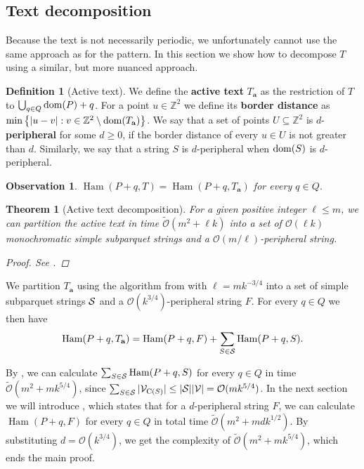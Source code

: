 \documentclass[11pt]{article}
\newcommand{\Z}{\mathbb{Z}}
\renewcommand{\O}{\mathcal{O}}
\newcommand{\tO}{\tilde{\mathcal{O}}}
\newcommand{\set}[1]{\left\lbrace #1 \right\rbrace}
\theoremstyle{plain}
\newtheorem{theorem}{Theorem}
\newtheorem{observation}{Observation}
\theoremstyle{definition}
\newtheorem{definition}{Definition}
\theoremstyle{remark}
\DeclareMathOperator*{\Ham}{Ham}
\begin{document}
\subsection{Text decomposition}
Because the text is not necessarily periodic, we unfortunately cannot use the same approach as for the pattern.
In this section we show how to decompose $T$ using a similar, but more nuanced approach.


\newcommand{\Ta}{T_\mathbf{a}}
\begin{definition}[Active text]
	We define the \textbf{active text} $\Ta$ as the restriction of $T$ to $\bigcup_{q \in Q} \d{P} + q$.
	For a point $u \in \Z^2$ we define its \textbf{border distance} as
	$\min\set{|u - v| : v \in \Z^2 \setminus \d{\Ta}} $.
	We say that a set of points $U \subseteq \Z^2$ is $d$-\textbf{peripheral} for some $d \ge 0$, if the border distance of every $u \in U$ is not greater than $d$.
	Similarly, we say that a string $S$ is $d$-peripheral when $\d{S}$ is $d$-peripheral.
\end{definition}


\begin{observation}
	$\Ham(P + q, T) = \Ham(P + q, \Ta)$ for every $q \in Q$.
\end{observation}


\begin{theorem}[Active text decomposition]\label{text_decomposition}
	For a given positive integer $\ell \le m$, we can partition the active text in time $\tO(m^2 + \ell k)$ into a set of $\O(\ell k)$ monochromatic simple subparquet strings
	and a $\O(m / \ell)$-peripheral string.
	\begin{proof} See . \end{proof}
\end{theorem}


We partition $\Ta$ using the algorithm from  with $\ell = mk^{-3/4}$ into a set of simple subparquet strings $\S$ and a $\O(k^{3 / 4})$-peripheral string $F$.
For every $q \in Q$ we then have
$$ \Ham(P + q, \Ta) = \Ham(P + q, F) + \sum_{S \in \S} \Ham(P + q, S).$$

By , we can calculate $\sum_{S \in \S} \Ham(P + q, S)$ for every $q \in Q$ in time $\tO(m^2 + mk^{5/4})$,
since $\sum_{S \in \S} |\V_{\getchar{S}}| \le |\S| |\V| = \O(mk^{5/4})$.
In the next section we will introduce , which states that for a $d$-peripheral string $F$, we can calculate $\Ham(P + q, F)$ for every $q \in Q$ in total time $\tO(m^2 + mdk^{1/2})$.
By substituting $d = \O(k^{3/4})$, we get the complexity of $\tO(m^2 + mk^{5/4})$, which ends the main proof.
\end{document}
